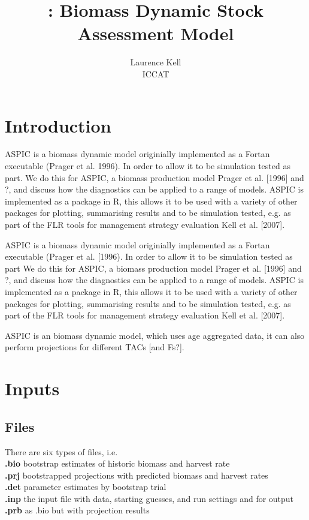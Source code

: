 \documentclass[shortnames,nojss,article]{jss}
\author{Laurence Kell\\ICCAT }
\title{\pkg{aspic}: Biomass Dynamic Stock Assessment Model}
\begin{document}



\section{Introduction}

ASPIC is a biomass dynamic model originially implemented as a Fortan executable (Prager et al. 1996). In order to allow it to be simulation tested as part. We do this for ASPIC, a biomass production model Prager et al. [1996] and ?, and discuss how the diagnostics can be applied to a range of models. ASPIC is implemented as a package in R, this allows it to be used with a variety of other packages for plotting, summarising results and to be simulation tested, e.g. as part of the FLR tools for management strategy evaluation Kell et al. [2007].

ASPIC is a biomass dynamic model originially implemented as a Fortan executable (Prager et al. [1996). In order to allow it to be simulation tested as part 
We do this for ASPIC, a biomass production model Prager et al. [1996] and ?, and discuss how the
diagnostics can be applied to a range of models. ASPIC is implemented as a package in R, this allows it
to be used with a variety of other packages for plotting, summarising results and to be simulation tested,
e.g. as part of the FLR tools for management strategy evaluation Kell et al. [2007].

ASPIC is an biomass dynamic model, which uses age aggregated data, it can also perform projections for different TACs [and Fs?].

\section{Inputs}

\subsection{Files}

There are six types of files, i.e.\\

 \textbf{.bio} bootstrap estimates of historic biomass and harvest rate\\
 \textbf{.prj}  bootstrapped projections with predicted biomass and harvest rates\\
 \textbf{.det}  parameter estimates by bootstrap trial\\
 \textbf{.inp}  the input file with data, starting guesses, and run settings and for output\\
 \textbf{.prb}  as .bio but with projection results\\
\end{document}
